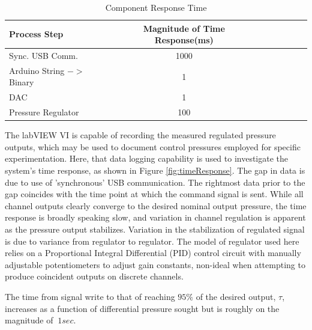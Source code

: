 \begin{table}[H]
\begin{center}
\begin{tabular}{l*{6}{c}r}
Process Step & Magnitude of Time Response(ms) \\
\hline
Sync. USB Comm. & 1000 \\
Arduino String $->$ Binary & 1 \\
DAC & 1\\
Pressure Regulator & 100\\
\end{tabular}
\caption [Component Response Time]{Component Response Time} 
\label{tab:compTime}
\end{center}
\end{table}

The labVIEW VI is capable of recording the measured regulated pressure outputs, which may be used to document control pressures employed for specific experimentation. Here, that data logging capability is used to investigate the system's time response, as shown in Figure \vref{fig:timeResponse}. The gap in data is due to use of 'synchronous' USB communication. The rightmost data prior to the gap coincides with the time point at which the command signal is sent. While all channel outputs clearly converge to the desired nominal output pressure, the time response is broadly speaking slow, and variation in channel regulation is apparent as the pressure output stabilizes. Variation in the stabilization of regulated signal is due to variance from regulator to regulator. The model of regulator used here relies on a Proportional Integral Differential (PID) control circuit with manually adjustable potentiometers to adjust gain constants, non-ideal when attempting to produce coincident outputs on discrete channels.

The time from signal write to that of reaching $95\%$ of the desired output, $\tau$, increases as a function of differential pressure sought but is roughly on the magnitude of $~1 sec$. 

